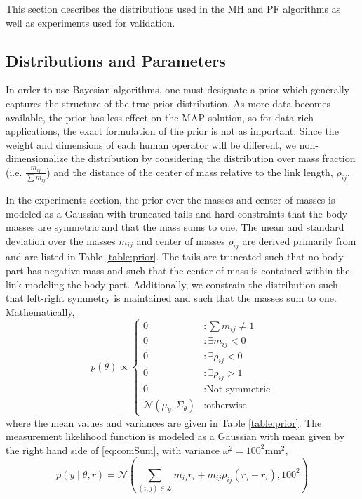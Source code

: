 This section describes the distributions used in the MH and PF algorithms as well as experiments used for validation.

\subsection{Distributions and Parameters}
\label{distribution}
In order to use Bayesian algorithms, one must designate a prior which generally captures the structure of the true prior distribution. As more data becomes available, the prior has less effect on the MAP solution, so for data rich applications, the exact formulation of the prior is not as important. Since the weight and dimensions of each human operator will be different, we non-dimensionalize the distribution by considering the distribution over mass fraction (i.e. $\frac{m_{ij}}{\sum m_{ij}}$) and the distance of the center of mass relative to the link length, $\rho_{ij}$. 

In the experiments section, the prior over the masses and center of masses is modeled as a Gaussian with truncated tails and hard constraints that the body masses are symmetric and that the mass sums to one. 
The mean and standard deviation over the masses $m_{ij}$ and center of masses $\rho_{ij}$ are derived primarily from \cite{jensen1989changes,armstrong1988anthropometry} and are listed in Table \ref{table:prior}. 
The tails are truncated such that no body part has negative mass and such that the center of mass is contained within the link modeling the body part.
Additionally, we constrain the distribution such that left-right symmetry is maintained and such that the masses sum to one. Mathematically,
\begin{equation}
p(\theta) \propto
\left\{
  \begin{array}{lc}
    	0& : \sum m_{ij} \neq 1 \\
	0& : \exists m_{ij} < 0 \\
	0& : \exists \rho_{ij} < 0 \\
	0& : \exists \rho_{ij} > 1 \\
	0& : \text{Not symmetric}  \\
    	\mathcal{N}(\mu_\theta,\Sigma_\theta) & : \text{otherwise}
    
  \end{array}
\right.
\end{equation}
where the mean values and variances are given in Table \ref{table:prior}.
The measurement likelihood function is modeled as a Gaussian with mean given by the right hand side of \eqref{eq:comSum}, with variance $\omega^2 = 100^2\text{mm}^2$,
\begin{equation}
p(y \mid \theta, r) = \mathcal{N}(\sum_{(i,j)\in\mathcal{L}} m_{ij} r_i + m_{ij}\rho_{ij}(r_j - r_i), 100^2)
\end{equation}

